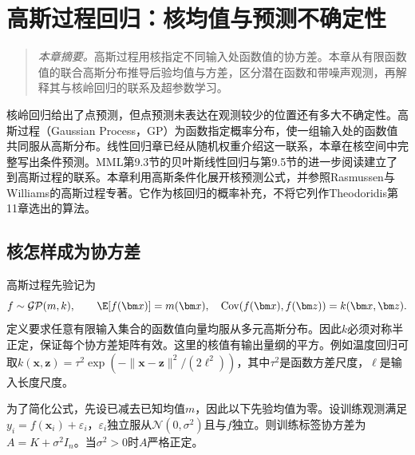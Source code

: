 \chapter{高斯过程回归：核均值与预测不确定性}
\label{chap:kernel-gp}
\begin{quote}\small
\textit{本章摘要。}高斯过程用核指定不同输入处函数值的协方差。本章从有限函数值的联合高斯分布推导后验均值与方差，区分潜在函数和带噪声观测，再解释其与核岭回归的联系及超参数学习。
\end{quote}

核岭回归给出了点预测，但点预测未表达在观测较少的位置还有多大不确定性。高斯过程（Gaussian Process，GP）为函数指定概率分布，使一组输入处的函数值共同服从高斯分布。线性回归章已经从随机权重介绍这一联系，本章在核空间中完整写出条件预测。MML第9.3节的贝叶斯线性回归与第9.5节的进一步阅读建立了到高斯过程的联系\cite{deisenroth2020mml}。本章利用高斯条件化展开核预测公式，并参照Rasmussen与Williams的高斯过程专著\cite{rasmussen2006gpml}。它作为核回归的概率补充，不将它列作Theodoridis第11章选出的算法。

\section{核怎样成为协方差}
高斯过程先验记为
\begin{equation}
 f\sim\mathcal{GP}(m,k),\qquad
 \E[f(\bm x)]=m(\bm x),\quad
 \operatorname{Cov}(f(\bm x),f(\bm z))=k(\bm x,\bm z).
\end{equation}
定义要求任意有限输入集合的函数值向量均服从多元高斯分布。因此$k$必须对称半正定，保证每个协方差矩阵有效。这里的核值有输出量纲的平方。例如温度回归可取$k(\bm x,\bm z)=\tau^2\exp(-\|\bm x-\bm z\|^2/(2\ell^2))$，其中$\tau^2$是函数方差尺度，$\ell$是输入长度尺度。

为了简化公式，先设已减去已知均值$m$，因此以下先验均值为零。设训练观测满足$y_i=f(\bm x_i)+\varepsilon_i$，$\varepsilon_i$独立服从$\mathcal N(0,\sigma^2)$且与$f$独立。则训练标签协方差为$A=K+\sigma^2I_n$。当$\sigma^2>0$时$A$严格正定。

